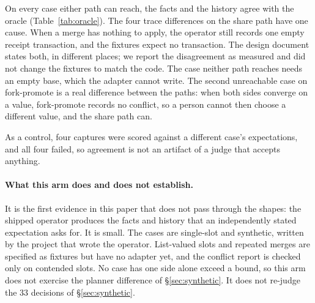 On every case either path can reach, the facts and the history agree with the
oracle (Table~\ref{tab:oracle}). The four trace differences on the share path
have one cause. When a merge has nothing to apply, the operator still records
one empty receipt transaction, and the fixtures expect no transaction. The
design document states both, in different places; we report the disagreement
as measured and did not change the fixtures to match the code. The case
neither path reaches needs an empty base, which the adapter cannot write. The
second unreachable case on fork-promote is a real difference between the paths:
when both sides converge on a value, fork-promote records no conflict, so a
person cannot then choose a different value, and the share path can.

As a control, four captures were scored against a different case's
expectations, and all four failed, so agreement is not an artifact of a judge
that accepts anything.

\paragraph{What this arm does and does not establish.} It is the first evidence
in this paper that does not pass through the shapes: the shipped operator
produces the facts and history that an independently stated expectation asks
for. It is small. The cases are single-slot and synthetic, written by the
project that wrote the operator. List-valued slots and repeated merges are
specified as fixtures but have no adapter yet, and the conflict report is
checked only on contended slots. No case has one side alone exceed a bound, so
this arm does not exercise the planner difference of \S\ref{sec:synthetic}. It does not re-judge the $33$ decisions of
\S\ref{sec:synthetic}.
